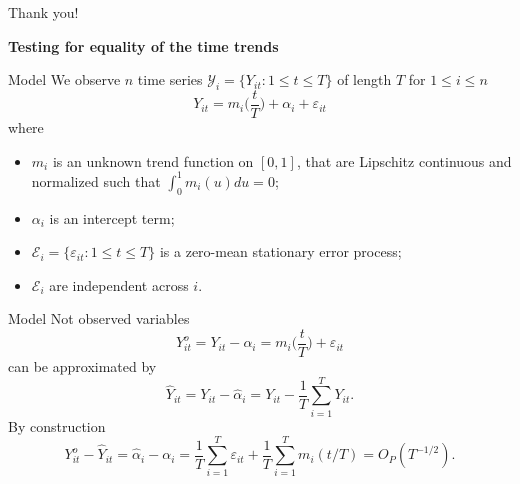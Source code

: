 \documentclass[10pt, handout]{beamer}
\begin{document}
\begin{frame}[standout]
  Thank you!
\end{frame}




\appendix





\begin{frame}
\thispagestyle{empty}
\begin{center}
\Large{\textbf{Testing for equality of the time trends}}
\end{center}
\end{frame}

\begin{frame}{Model}
We observe $n$ time series $\mathcal{Y}_i = \{Y_{it}: 1 \le t \le T \}$ of length $T$ for $1 \le i \le n$
\begin{equation*}\label{model2}
Y_{it} = m_i \Big( \frac{t}{T} \Big) + \alpha_i +\varepsilon_{it} 
\end{equation*}\pause
\vspace{-3mm}
where
\begin{itemize}
\item $m_i$ is an unknown trend function on $[0,1]$, that are Lipschitz continuous and normalized such that $\int_0^1 m_i(u)du = 0$;
\item $\alpha_i$ is an intercept term;
\item $\mathcal{E}_i = \{ \varepsilon_{it}: 1 \le t \le T \}$ is a zero-mean stationary error process;
\item $\mathcal{E}_i$ are independent across $i$.
\end{itemize}
\end{frame}

\begin{frame}{Model}
Not observed variables
\begin{equation*}\label{model2}
Y^o_{it} = Y_{it} - \alpha_i = m_i \Big( \frac{t}{T} \Big) +\varepsilon_{it} 
\end{equation*}
can be approximated by 
\begin{equation*}\label{model2}
\widehat{Y}_{it} = Y_{it} - \widehat{\alpha}_i = Y_{it} - \frac{1}{T}\sum_{i=1}^T Y_{it}.
\end{equation*}
By construction 
\begin{equation*}\label{model2}
Y^o_{it} - \widehat{Y}_{it} = \widehat{\alpha}_i - \alpha_i = \frac{1}{T}\sum_{i=1}^T \varepsilon_{it} + \frac{1}{T}\sum_{i=1}^T m_i(t/T) = O_P(T^{-1/2}).
\end{equation*}
\end{frame}
\end{document}
